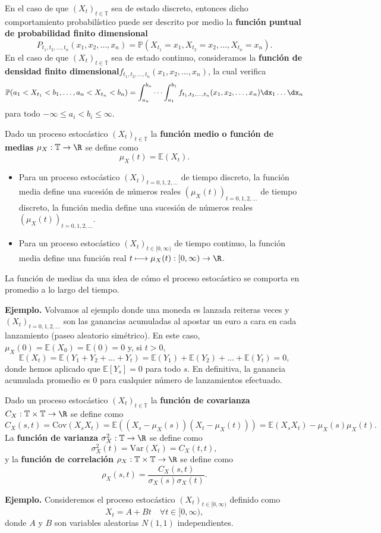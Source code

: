 En el caso de que $(X_t)_{t\in \mathbb{T}}$ sea de estado discreto, entonces dicho comportamiento probabilístico puede ser descrito por medio la \textbf{función puntual de probabilidad finito dimensional} \[
P_{t_1,t_2,\dots,t_n}(x_1,x_2,\dots,x_n)=\mathbb{P}(X_{t_1}=x_1,X_{t_2}=x_2,\dots,X_{t_n}=x_n).
\] 
En el caso de que $(X_t)_{t\in \mathbb{T}}$ sea de estado continuo, consideramos la \textbf{función de densidad finito dimensional}\newline $f_{t_1,t_2,\dots,t_n}(x_1,x_2,\dots,x_n)$, la cual verifica \[
\mathbb{P}(a_1<X_{t_1}<b_1,\dots,a_n<X_{t_n}<b_n)=\int_{a_n}^{b_n} \cdots \int_{a_1}^{b_1} f_{t_1,t_2,\dots,t_n}(x_1,x_2,\dots,x_n)\dx_1\dots \dx_n  
\] para todo $-\infty\le a_i<b_i\le \infty$.
\begin{definition}
    Dado un proceso estocástico $(X_t)_{t\in \mathbb{T}}$ la \textbf{función medio o función de medias} $\mu_X:\mathbb{T}\to \R$ se define como \[
    \mu_X(t)=\mathbb{E}(X_t).
    \]  
\end{definition}
\begin{itemize}[label=\textbullet]
    \item Para un proceso estocástico $(X_t)_{t=0,1,2,\dots}$ de tiempo discreto, la función media define una sucesión de números reales $(\mu_X(t))_{t=0,1,2,\dots}$ de tiempo discreto, la función media define una sucesión de números reales $(\mu_X(t))_{t=0,1,2,\dots}$.
    \item Para un proceso estocástico $(X_t)_{t\in [0,\infty)}$ de tiempo continuo, la función media define una función real $t \longmapsto \mu_X(t):[0,\infty)\to \R$.
\end{itemize}
La función de medias da una idea de cómo el proceso estocástico se comporta en promedio a lo largo del tiempo.

\textbf{Ejemplo.} Volvamos al ejemplo donde una moneda es lanzada reiteras veces y $(X_t)_{t=0,1,2,\dots}$ son las ganancias acumuladas al apostar un euro a cara en cada lanzamiento (paseo aleatorio simétrico). En este caso, $\mu_X(0)=\mathbb{E}(X_0)=\mathbb{E}(0)=0$ y, si $t>0$,  \[
\mathbb{E}(X_t)=\mathbb{E}(Y_1+Y_2+\dots+Y_t)=\mathbb{E}(Y_1)+\mathbb{E}(Y_2)+\dots+\mathbb{E}(Y_t)=0,
\] donde hemos aplicado que $\mathbb{E}[Y_s]=0$ para todo $s$. En definitiva, la ganancia acumulada promedio es 0 para cualquier número de lanzamientos efectuado.
\begin{definition}
    Dado un proceso estocástico $(X_t)_{t\in \mathbb{T}}$ la \textbf{función de covarianza} $C_X:\mathbb{T}\times \mathbb{T}\to \R$ se define como \[
    C_X(s,t)=\mathrm{Cov}(X_sX_t)=\mathbb{E}\left( (X_s-\mu_X(s))(X_t-\mu_X(t)) \right) =\mathbb{E}(X_sX_t)-\mu_X(s)\mu_X(t).
    \]  
    La \textbf{función de varianza} $\sigma_X^2:\mathbb{T}\to \R$ se define como \[
    \sigma_X^2(t)=\mathrm{Var}(X_t)=C_X(t,t),
    \]  
    y la \textbf{función de correlación} $\rho_X:\mathbb{T}\times \mathbb{T}\to \R$ se define como \[
    \rho_X(s,t)=\dfrac{C_X(s,t)}{\sigma_X(s)\sigma_X(t)}.
    \]  
\end{definition}
\textbf{Ejemplo.} Consideremos el proceso estocástico $(X_t)_{t\in [0,\infty)}$ definido como \[
    X_t=A+Bt\quad\forall t\in [0,\infty),
\] donde $A$ y  $B$ son variables aleatorias  $N(1,1)$ independientes.

